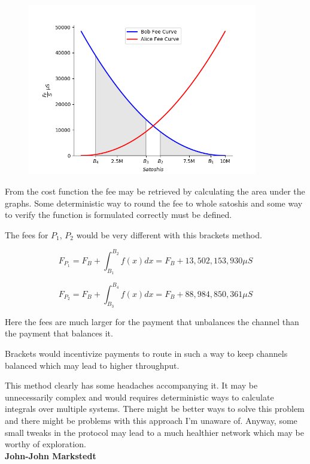 \begin{figure}[!htb]
	\vspace{-0.7cm}
	\centering
	\includegraphics[width=10cm]{images/fee_scheme.png}
	\label{fig:xt_nodes}
\end{figure}
\newpage

From the cost function the fee may be retrieved by calculating the area under the graphs. Some deterministic way to round the fee to whole satoshis and some way to verify the function is formulated correctly must be defined. 

The fees for $P_1$, $P_2$ would be very different with this brackets method.

\[ F_{P_1} = F_{B} + \int_{B_1}^{B_2} f(x) dx = F_B + 13,502,153,930 \mu S \] 

\[ F_{P_2} = F_{B} + \int_{B_3}^{B_4} f(x) dx  = F_B + 88,984,850,361 \mu S \]
 
Here the fees are much larger for the payment that unbalances the channel than the payment that balances it. 

Brackets would incentivize payments to route in such a way to keep channels balanced which may lead to higher throughput. %

This method clearly has some headaches accompanying it. It may be unnecessarily complex and would requires deterministic ways to calculate integrals over multiple systems. There might be better ways to solve this problem and there might be problems with this approach I'm unaware of. Anyway, some small tweaks in the protocol may lead to a much healthier network which may be worthy of exploration.\\

\textbf{John-John Markstedt}

